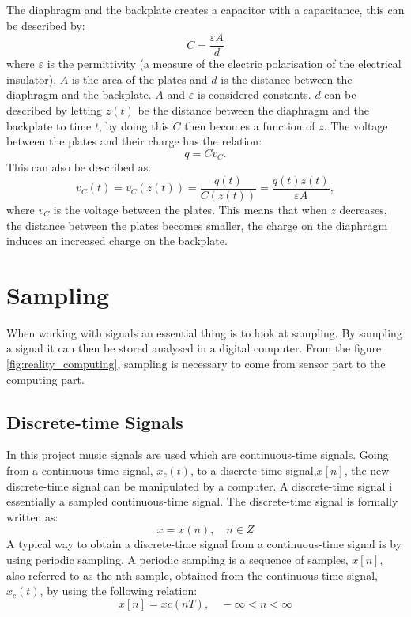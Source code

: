 \noindent The diaphragm and the backplate creates a capacitor with a capacitance, this can be described by:
$$ C = \dfrac{\varepsilon A}{d}$$ 
\indent where $\varepsilon$ is the permittivity (a measure of the electric polarisation of the electrical insulator), $A$ is the area of the plates and $d$ is the distance between the diaphragm and the backplate. $A$ and $\varepsilon$ is considered constants. $d$ can be described by letting $z(t)$ be the distance between the diaphragm and the backplate to time $t$, by doing this $C$ then becomes a function of $z$. The voltage between the plates and their charge has the relation:
$$q=C v_C.$$
This can also be described as:
$$v_C(t)=v_C(z(t))= \dfrac{q(t)}{C(z(t))} = \dfrac{q(t)z(t)}{\varepsilon A},$$
\indent where $v_C$ is the voltage between the plates. This means that when $z$ decreases, the distance between the plates becomes smaller, the charge on the diaphragm induces an increased charge on the backplate. 
\cite[p. 160-161]{LectureNotes}


\section{Sampling}

When working with signals an essential thing is to look at sampling. By sampling a signal it can then be stored analysed in a digital computer. From the figure \ref{fig:reality_computing}, sampling is necessary to come from sensor part to the computing part.  \\ 

\subsection{Discrete-time Signals}
In this project music signals are used which are continuous-time signals. Going from a continuous-time signal, $x_c(t)$, to a discrete-time signal,$x[n]$, the new discrete-time signal can be manipulated by a computer. A discrete-time signal i essentially a sampled continuous-time signal. The discrete-time signal is formally written as:
$$x={x(n)}, \quad    n \in Z$$
A typical way to obtain a discrete-time signal from a continuous-time signal is by using periodic sampling. A periodic sampling is a sequence of samples, $x[n]$, also referred to as the nth sample, obtained from the continuous-time signal,$x_c(t)$, by using the following relation:
$$x[n]=xc (nT), \quad    - \infty <n< \infty$$

